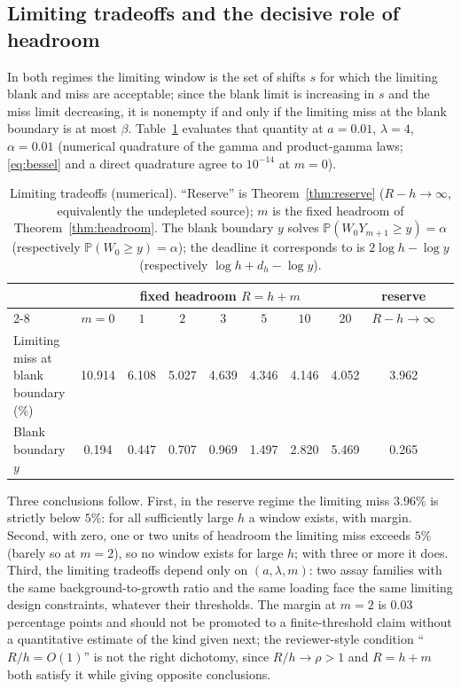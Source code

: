 \documentclass[11pt,a4paper]{article}
\theoremstyle{plain}
\theoremstyle{definition}
\theoremstyle{remark}
\newcommand{\Prob}{\mathbb P}
\begin{document}
\subsection{Limiting tradeoffs and the decisive role of headroom}\label{sec:limits}
In both regimes the limiting window is the set of shifts $s$ for which the limiting blank and miss are acceptable; since the blank limit is increasing in $s$ and the miss limit decreasing, it is nonempty if and only if the limiting miss at the blank boundary is at most $\beta$. Table~\ref{tab:limits} evaluates that quantity at $a=0.01$, $\lambda=4$, $\alpha=0.01$ (numerical quadrature of the gamma and product-gamma laws; \eqref{eq:bessel} and a direct quadrature agree to $10^{-14}$ at $m=0$).

\begin{table}[htbp]\centering\scriptsize\setlength{\tabcolsep}{4pt}
\begin{tabular}{lccccccccc}\toprule
& \multicolumn{7}{c}{fixed headroom $R=h+m$} & reserve\\\cmidrule(lr){2-8}
& $m=0$ & $1$ & $2$ & $3$ & $5$ & $10$ & $20$ & $R-h\to\infty$\\\midrule
Limiting miss at blank boundary (\%) & 10.914 & 6.108 & 5.027 & 4.639 & 4.346 & 4.146 & 4.052 & 3.962\\
Blank boundary $y$ & 0.194 & 0.447 & 0.707 & 0.969 & 1.497 & 2.820 & 5.469 & 0.265\\\bottomrule
\end{tabular}
\caption{Limiting tradeoffs (numerical). ``Reserve'' is Theorem~\ref{thm:reserve} ($R-h\to\infty$, equivalently the undepleted source); $m$ is the fixed headroom of Theorem~\ref{thm:headroom}. The blank boundary $y$ solves $\Prob(W_0Y_{m+1}\ge y)=\alpha$ (respectively $\Prob(W_0\ge y)=\alpha$); the deadline it corresponds to is $2\log h-\log y$ (respectively $\log h+d_h-\log y$).}
\label{tab:limits}
\end{table}

Three conclusions follow. First, in the reserve regime the limiting miss $3.96\%$ is strictly below $5\%$: for all sufficiently large $h$ a window exists, with margin. Second, with zero, one or two units of headroom the limiting miss exceeds $5\%$ (barely so at $m=2$), so no window exists for large $h$; with three or more it does. Third, the limiting tradeoffs depend only on $(a,\lambda,m)$: two assay families with the same background-to-growth ratio and the same loading face the same limiting design constraints, whatever their thresholds. The margin at $m=2$ is $0.03$ percentage points and should not be promoted to a finite-threshold claim without a quantitative estimate of the kind given next; the reviewer-style condition ``$R/h=O(1)$'' is not the right dichotomy, since $R/h\to\rho>1$ and $R=h+m$ both satisfy it while giving opposite conclusions.
\end{document}
